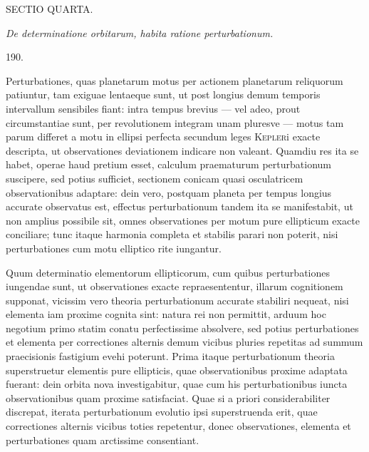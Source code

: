 \clearpage
{}
\begin{center}
{\large SECTIO QUARTA.}\par\medskip
{}
\textit{De determinatione orbitarum, habita ratione perturbationum.}
\end{center}
\begin{center}\hypertarget{native-264-article190}{}190.\end{center}
Perturbationes, quas planetarum motus per actionem planetarum reliquorum
patiuntur, tam exiguae lentaeque sunt, ut post longius demum temporis
intervallum sensibiles fiant: intra tempus brevius --- vel adeo, prout circumstantiae
sunt, per revolutionem integram unam pluresve --- motus tam parum
differet a motu in ellipsi perfecta secundum leges \textsc{Kepler}i exacte descripta,
ut observationes deviationem indicare non valeant. Quamdiu res ita se habet,
operae haud pretium esset, calculum praematurum perturbationum suscipere,
sed potius sufficiet, sectionem conicam quasi osculatricem observationibus adaptare:
dein vero, postquam planeta per tempus longius accurate observatus
est, effectus perturbationum tandem ita se manifestabit, ut non amplius possibile
sit, omnes observationes per motum pure ellipticum exacte conciliare;
tunc itaque harmonia completa et stabilis parari non poterit, nisi perturbationes
cum motu elliptico rite iungantur.

Quum determinatio elementorum ellipticorum, cum quibus perturbationes
iungendae sunt, ut observationes exacte repraesententur, illarum cognitionem
supponat, vicissim vero theoria perturbationum accurate stabiliri nequeat, nisi
elementa iam proxime cognita sint: natura rei non permittit, arduum hoc
negotium primo statim conatu perfectissime absolvere, sed potius perturbationes
et elementa per correctiones alternis demum vicibus pluries repetitas ad summum
praecisionis fastigium evehi poterunt. Prima itaque perturbationum
theoria superstruetur elementis pure ellipticis, quae observationibus proxime
adaptata fuerant: dein orbita nova investigabitur, quae cum his perturbationibus
iuncta observationibus quam proxime satisfaciat. Quae si a priori considerabiliter
discrepat, iterata perturbationum evolutio ipsi superstruenda erit,
quae correctiones alternis vicibus toties repetentur, donec observationes, elementa
et perturbationes quam arctissime consentiant.
